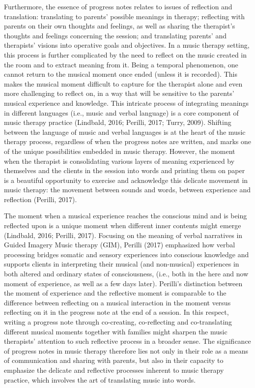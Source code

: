 \documentclass[authordate, empirical, issue]{jote-new-article}
\begin{document}
Furthermore, the essence of progress notes relates to issues of reflection and translation: translating to parents' possible meanings in therapy; reflecting with parents on their own thoughts and feelings, as well as sharing the therapist's thoughts and feelings concerning the session; and translating parents' and therapists' visions into operative goals and objectives. In a music therapy setting, this process is further complicated by the need to reflect on the music created in the room and to extract meaning from it. Being a temporal phenomenon, one cannot return to the musical moment once ended (unless it is recorded). This makes the musical moment difficult to capture for the therapist alone and even more challenging to reflect on, in a way that will be sensitive to the parents' musical experience and knowledge. This intricate process of integrating meanings in different languages (i.e., music and verbal language) is a core component of music therapy practice (Lindbald, 2016; Perilli, 2017; Turry, 2009). Shifting between the language of music and verbal languages is at the heart of the music therapy process, regardless of when the progress notes are written, and marks one of the unique possibilities embedded in music therapy. However, the moment when the therapist is consolidating various layers of meaning experienced by themselves and the clients in the session into words and printing them on paper is a beautiful opportunity to exercise and acknowledge this delicate movement in music therapy: the movement between sounds and words, between experience and reflection (Perilli, 2017).



The moment when a musical experience reaches the conscious mind and is being reflected upon is a unique moment when different inner contents might emerge (Lindbald, 2016; Perilli, 2017). Focusing on the meaning of verbal narratives in Guided Imagery Music therapy (GIM), Perilli (2017) emphasized how verbal processing bridges somatic and sensory experiences into conscious knowledge and supports clients in interpreting their musical (and non-musical) experiences in both altered and ordinary states of consciousness, (i.e., both in the here and now moment of experience, as well as a few days later). Perilli's distinction between the moment of experience and the reflective moment is comparable to the difference between reflecting on a musical interaction in the moment versus reflecting on it in the progress note at the end of a session. In this respect, writing a progress note through co-creating, co-reflecting and co-translating different musical moments together with families might sharpen the music therapists' attention to such reflective process in a broader sense. The significance of progress notes in music therapy therefore lies not only in their role as a means of communication and sharing with parents, but also in their capacity to emphasize the delicate and reflective processes inherent to music therapy practice, which involves the art of translating music into words.
\end{document}

